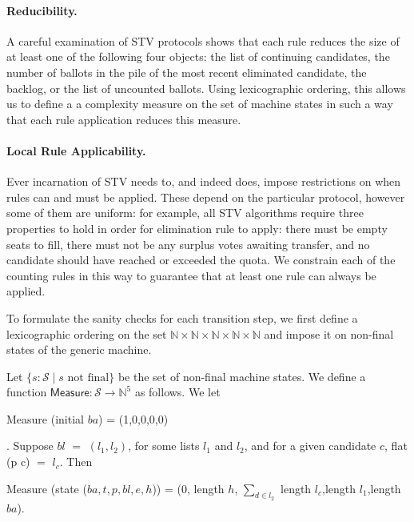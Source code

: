 \documentclass{llncs}
\begin{document}
\paragraph{Reducibility.} 
A careful examination of STV protocols shows that each rule
reduces the size of at least one of the following four
objects: the list of continuing candidates, the number of 
ballots in the pile of the most recent eliminated candidate,  the
backlog, or the list of uncounted ballots. Using lexicographic
ordering, this allows us to define a 
a complexity measure on the set of
machine states in such a way that each rule application reduces this
measure. 

\paragraph{Local Rule Applicability.}
Ever incarnation of STV needs to, and indeed does, impose 
restrictions on when rules can and must be applied. These
depend on the particular protocol, however some
of them are uniform: for example, all STV
algorithms require three properties to hold in order for elimination
rule to apply: there must be empty seats to fill, there must not be
any surplus votes awaiting transfer, and no candidate should have
reached or exceeded the quota. We constrain each of the counting
rules in this way to guarantee that at least one rule can always be
applied. 

To formulate the sanity checks for each transition step, we first  define a lexicographic ordering on the set $\mathbb{N}\times\mathbb{N}\times\mathbb{N}\times\mathbb{N}
\times\mathbb{N}$ and impose it on non-final states of the generic machine.   
\begin{definition} \label{defn:measure}
Let $\{s: \mathcal{S} \mid s\mbox{ not final}\}$ be the set of
non-final machine states. We define a function $\mathsf{Measure}:
\mathcal{S} \to
\mathbb{N}^5$ as follows. We let
\begin{small}\textsf{Measure} (\textsf{initial} $ba$) = (1,0,0,0,0)\end{small}. Suppose $bl$ $=$ $(l_{1},l_{2})$, for some lists $l_{1}$ and $l_{2}$, and for a given candidate $c$, \textsf{flat} (p c) $=$ $l_{c}$. Then   
\begin{small}
\begin{center}
 \textsf{Measure} (\textsf{state} ($ba,t,p,bl,e,h$)) = (0, \textsf{length} $h$, $\sum_{d\in l_{2}}^{}$ \textsf{length} $l_{c}$,\textsf{length} $l_{1}$,\textsf{length}  $ba$).
\end{center}
\end{small}
\end{definition}
\end{document}
